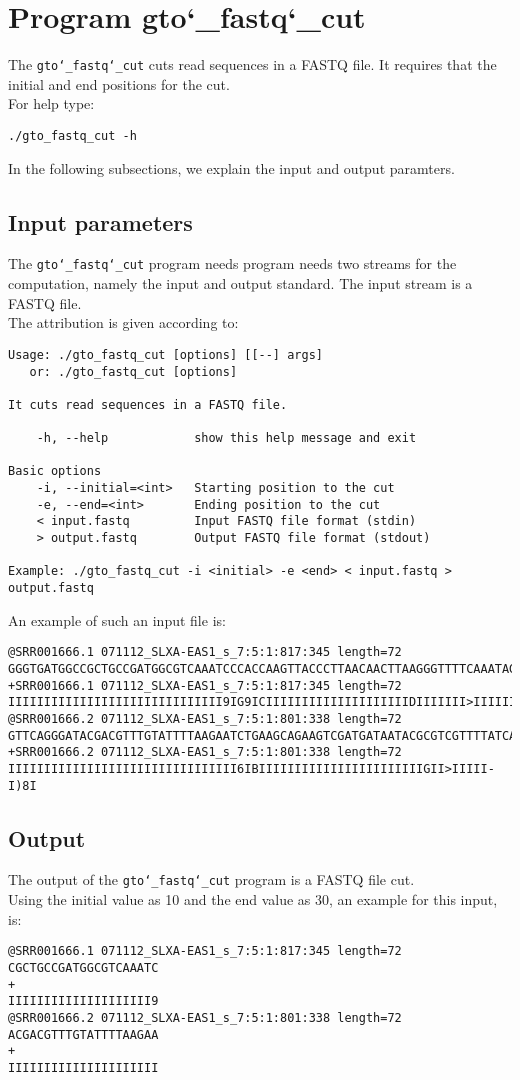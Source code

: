 \section{Program gto\char`_fastq\char`_cut}
The \texttt{gto\char`_fastq\char`_cut} cuts read sequences in a FASTQ file. It requires that the initial and end positions for the cut.\\
For help type:
\begin{lstlisting}
./gto_fastq_cut -h
\end{lstlisting}
In the following subsections, we explain the input and output paramters.

\subsection*{Input parameters}

The \texttt{gto\char`_fastq\char`_cut} program needs program needs two streams for the computation, namely the input and output standard. The input stream is a FASTQ file.\\
The attribution is given according to:
\begin{lstlisting}
Usage: ./gto_fastq_cut [options] [[--] args]
   or: ./gto_fastq_cut [options]

It cuts read sequences in a FASTQ file.

    -h, --help            show this help message and exit

Basic options
    -i, --initial=<int>   Starting position to the cut
    -e, --end=<int>       Ending position to the cut
    < input.fastq         Input FASTQ file format (stdin)
    > output.fastq        Output FASTQ file format (stdout)

Example: ./gto_fastq_cut -i <initial> -e <end> < input.fastq > output.fastq
\end{lstlisting}
An example of such an input file is:
\begin{lstlisting}
@SRR001666.1 071112_SLXA-EAS1_s_7:5:1:817:345 length=72
GGGTGATGGCCGCTGCCGATGGCGTCAAATCCCACCAAGTTACCCTTAACAACTTAAGGGTTTTCAAATAGA
+SRR001666.1 071112_SLXA-EAS1_s_7:5:1:817:345 length=72
IIIIIIIIIIIIIIIIIIIIIIIIIIIIII9IG9ICIIIIIIIIIIIIIIIIIIIIDIIIIIII>IIIIII/
@SRR001666.2 071112_SLXA-EAS1_s_7:5:1:801:338 length=72
GTTCAGGGATACGACGTTTGTATTTTAAGAATCTGAAGCAGAAGTCGATGATAATACGCGTCGTTTTATCAT
+SRR001666.2 071112_SLXA-EAS1_s_7:5:1:801:338 length=72
IIIIIIIIIIIIIIIIIIIIIIIIIIIIIIII6IBIIIIIIIIIIIIIIIIIIIIIIIGII>IIIII-I)8I
\end{lstlisting}

\subsection*{Output}
The output of the \texttt{gto\char`_fastq\char`_cut} program is a FASTQ file cut.\\
Using the initial value as 10 and the end value as 30, an example for this input, is:
\begin{lstlisting}
@SRR001666.1 071112_SLXA-EAS1_s_7:5:1:817:345 length=72
CGCTGCCGATGGCGTCAAATC
+
IIIIIIIIIIIIIIIIIIII9
@SRR001666.2 071112_SLXA-EAS1_s_7:5:1:801:338 length=72
ACGACGTTTGTATTTTAAGAA
+
IIIIIIIIIIIIIIIIIIIII
\end{lstlisting}